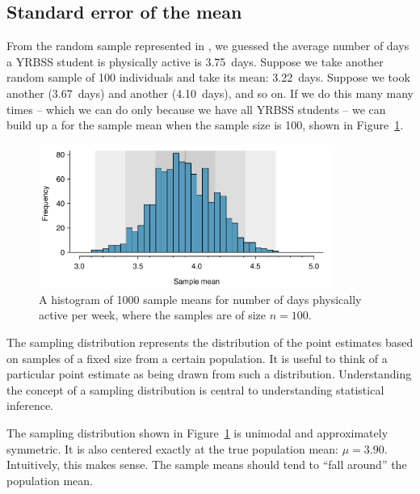 \subsection{Standard error of the mean}
\label{seOfTheMean}

From the random sample represented in , we guessed the average number of days a YRBSS student is physically active is 3.75~days. Suppose we take another random sample of 100 individuals and take its mean: 3.22~days. Suppose we took another (3.67~days) and another (4.10~days), and so on. If we do this many many times -- which we can do only because we have all YRBSS students -- we can build up a  for the sample mean when the sample size is 100, shown in Figure~\ref{yrbssActive1000SampDist}.

\begin{figure}[h]
   \centering
   \includegraphics[width=0.85\textwidth]{ch_inference_foundations/figures/yrbssActive1000SampDist/yrbssActive1000SampDist}
   \caption{A histogram of 1000 sample means for number of days physically active per week, where the samples are of size $n=100$.}
   \label{yrbssActive1000SampDist}
\end{figure}

\begin{termBox}{
The sampling distribution represents the distribution of the point estimates based on samples of a fixed size from a certain population. It is useful to think of a particular point estimate as being drawn from such a distribution. Understanding the concept of a sampling distribution is central to understanding statistical inference.}
\end{termBox}

The sampling distribution shown in Figure~\ref{yrbssActive1000SampDist} is unimodal and approximately symmetric. It is also centered exactly at the true population mean: $\mu=3.90$. Intuitively, this makes sense. The sample means should tend to ``fall around'' the population mean.

